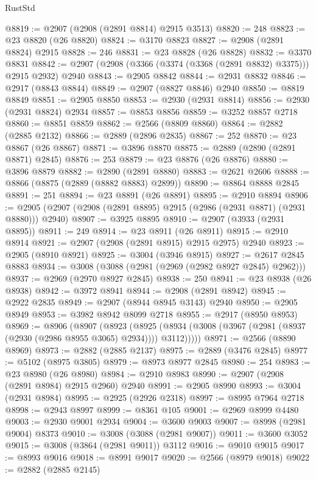 \begin{lexlean}{RustStd}
\begin{coremodule}
@8819 := @2907 (@2908 (@2891 @8814) @2915 @3513)
@8820 := 248
@8823 := @23 @8820 (@26 @8820)
@8824 := @3170 @8823
@8827 := @2908 (@2891 @8824) @2915
@8828 := 246
@8831 := @23 @8828 (@26 @8828)
@8832 := @3370 @8831
@8842 := @2907 (@2908 (@3366 (@3374 (@3368 (@2891 @8832) @3375))) @2915 @2932) @2940
@8843 := @2905 @8842
@8844 := @2931 @8832
@8846 := @2917 (@8843 @8844)
@8849 := @2907 (@8827 @8846) @2940
@8850 := @8819 @8849
@8851 := @2905 @8850
@8853 := @2930 (@2931 @8814)
@8856 := @2930 (@2931 @8824) @2934
@8857 := @8853 @8856
@8859 := @3252 @8857 @2718
@8860 := @8851 @8859
@8862 := @2566 (@8809 @8860)
@8864 := @2882 (@2885 @2132)
@8866 := @2889 (@2896 @2835)
@8867 := 252
@8870 := @23 @8867 (@26 @8867)
@8871 := @3896 @8870
@8875 := @2889 (@2890 (@2891 @8871) @2845)
@8876 := 253
@8879 := @23 @8876 (@26 @8876)
@8880 := @3896 @8879
@8882 := @2890 (@2891 @8880)
@8883 := @2621 @2606
@8888 := @8866 (@8875 (@2889 (@8882 @8883) @2899))
@8890 := @8864 @8888 @2845
@8891 := 251
@8894 := @23 @8891 (@26 @8891)
@8895 := @2910 @8894
@8906 := @2905 (@2907 (@2908 (@2891 @8895) @2915 (@2986 (@2931 @8871) (@2931 @8880))) @2940)
@8907 := @3925 @8895
@8910 := @2907 (@3933 (@2931 @8895))
@8911 := 249
@8914 := @23 @8911 (@26 @8911)
@8915 := @2910 @8914
@8921 := @2907 (@2908 (@2891 @8915) @2915 @2975) @2940
@8923 := @2905 (@8910 @8921)
@8925 := @3004 (@3946 @8915)
@8927 := @2617 @2845 @8883
@8934 := @3008 (@3088 (@2981 (@2969 (@2982 @8927 @2845) @2962)))
@8937 := @2969 (@2970 @8927 @2845)
@8938 := 250
@8941 := @23 @8938 (@26 @8938)
@8942 := @3972 @8941
@8944 := @2908 (@2891 @8942)
@8945 := @2922 @2835
@8949 := @2907 (@8944 @8945 @3143) @2940
@8950 := @2905 @8949
@8953 := @3982 @8942 @8099 @2718
@8955 := @2917 (@8950 @8953)
@8969 := @8906
    (@8907
      (@8923
        (@8925 (@8934 (@3008 (@3967 (@2981 (@8937 (@2930 (@2986 @8955 @3065) @2934)))) @3112)))))
@8971 := @2566 (@8890 @8969)
@8973 := @2882 (@2885 @2137)
@8975 := @2889 (@3476 @2845)
@8977 := @5102 (@8975 @3805)
@8979 := @8973 @8977 @2845
@8980 := 254
@8983 := @23 @8980 (@26 @8980)
@8984 := @2910 @8983
@8990 := @2907 (@2908 (@2891 @8984) @2915 @2960) @2940
@8991 := @2905 @8990
@8993 := @3004 (@2931 @8984)
@8995 := @2925 (@2926 @2318)
@8997 := @8995 @7964 @2718
@8998 := @2943 @8997
@8999 := @8361 @105
@9001 := @2969 @8999 @4480
@9003 := @2930 @9001 @2934
@9004 := @3600 @9003
@9007 := @8998 (@2981 @9004) @8373
@9010 := @3008 (@3088 (@2981 @9007))
@9011 := @3600 @3052
@9015 := @3008 (@3864 (@2981 @9011)) @3112
@9016 := @9010 @9015
@9017 := @8993 @9016
@9018 := @8991 @9017
@9020 := @2566 (@8979 @9018)
@9022 := @2882 (@2885 @2145)

\end{coremodule}
\end{lexlean}
